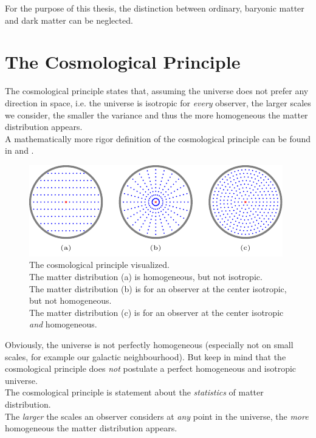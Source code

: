 \noindent For the purpose of this thesis, the distinction between ordinary, baryonic matter and dark matter can be neglected.



\section{The Cosmological Principle}

The cosmological principle states that, assuming the universe does not prefer any direction in space, i.e. the universe is isotropic for \textit{every} observer, the larger scales we consider, the smaller the variance and thus the more homogeneous the matter distribution appears. \\
A mathematically more rigor definition of the cosmological principle can be found in \cite[p.~5]{Bartelmann2019} and \cite[p.~713/714]{MTW2017}.
\begin{figure}[H]
    \centering
    \includegraphics[scale=2.2]{figures/tikz/homogeneous-isotropic/homogeneous-isotropic.pdf}
    \caption{The cosmological principle visualized. \\
    The matter distribution (a) is homogeneous, but not isotropic. \\
    The matter distribution (b) is for an observer at the center isotropic, but not homogeneous. \\
    The matter distribution (c) is for an observer at the center isotropic \textit{and} homogeneous.}
\end{figure}
\noindent Obviously, the universe is not perfectly homogeneous (especially not on small scales, for example our galactic neighbourhood). But keep in mind that the cosmological principle does \textit{not} postulate a perfect homogeneous and isotropic universe. \\
The cosmological principle is statement about the \textit{statistics} of matter distribution. \\
The \textit{larger} the scales an observer considers at \textit{any} point in the universe, the \textit{more} homogeneous the matter distribution appears. \\

